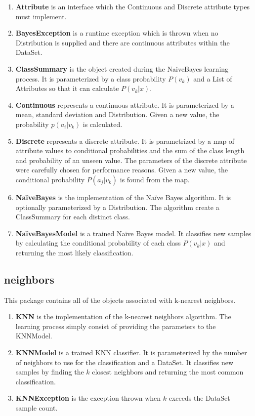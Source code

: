 \documentclass[11pt]{article}
\newcommand{\bb}{\textbf}
\begin{document}
\begin{enumerate}[leftmargin=*]
  \item[] \bb{Attribute} is an interface which the Continuous and Discrete attribute types must implement.
  \item[] \bb{BayesException} is a runtime exception which is thrown when no Distribution is supplied and there are continuous attributes within the DataSet.
  \item[] \bb{ClassSummary} is the object created during the NaiveBayes learning process. It is parameterized by a class probability $P(v_k)$ and a List of Attributes so that it can calculate $P(v_k|x)$.
  \item[] \bb{Continuous} represents a continuous attribute. It is parameterized by a mean, standard deviation and Distribution. Given a new value, the probability $p(a_i|v_k)$ is calculated.
  \item[] \bb{Discrete} represents a discrete attribute. It is parametrized by a map of attribute values to conditional probabilities and the sum of the class length and probability of an unseen value. The parameters of the discrete attribute were carefully chosen for performance reasons. Given a new value, the conditional probability $P(a_j|v_k)$ is found from the map.
  \item[] \bb{NaïveBayes} is the implementation of the Naïve Bayes algorithm. It is optionally parameterized by a Distribution. The algorithm create a ClassSummary for each distinct class.
  \item[] \bb{NaïveBayesModel} is a trained Naïve Bayes model. It classifies new samples by calculating the conditional probability of each class $P(v_k|x)$ and returning the most likely classification.
\end{enumerate}

\subsection{neighbors}
This package contains all of the objects associated with k-nearest neighbors.

\begin{enumerate}[leftmargin=*]
  \item[] \bb{KNN} is the implementation of the k-nearest neighbors algorithm. The learning process simply consist of providing the parameters to the KNNModel.
  \item[] \bb{KNNModel} is a trained KNN classifier. It is parameterized by the number of neighbors to use for the classification and a DataSet. It classifies new samples by finding the $k$ closest neighbors and returning the most common classification.
  \item[] \bb{KNNException} is the exception thrown when $k$ exceeds the DataSet sample count.
\end{enumerate}
\end{document}
